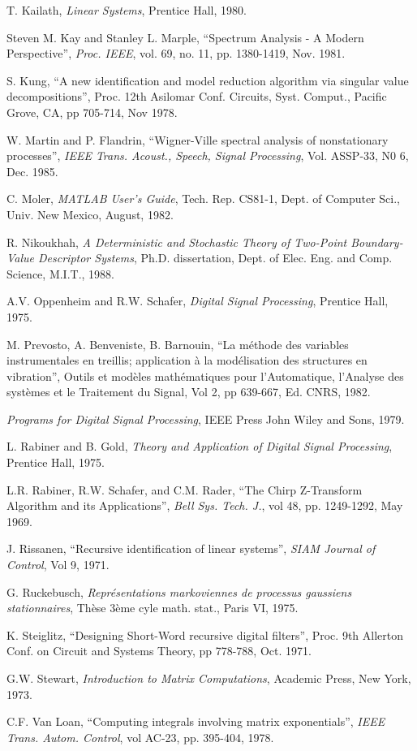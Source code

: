 \begin{thebibliography}{99}
 T. Kailath, {\em Linear Systems}, Prentice Hall, 1980.

 Steven M. Kay and Stanley L. Marple, ``Spectrum Analysis - A Modern Perspective'', {\em Proc. IEEE}, vol. 69, no. 11, pp. 1380-1419, Nov. 1981.

 S. Kung, ``A new identification and model reduction algorithm via singular value decompositions'', Proc. 12th Asilomar Conf. Circuits, Syst. Comput., Pacific Grove, CA, pp 705-714, Nov 1978.


 W. Martin and P. Flandrin, ``Wigner-Ville spectral analysis of nonstationary processes'', {\em IEEE Trans. Acoust., Speech, Signal Processing}, Vol. ASSP-33, N0 6, Dec. 1985.

  C. Moler, {\em MATLAB User's  Guide},  Tech.  Rep.  CS81-1, Dept.  of Computer Sci., Univ.  New Mexico, August, 1982.


 R. Nikoukhah, {\em A Deterministic and Stochastic Theory of Two-Point Boundary-Value Descriptor Systems}, Ph.D. dissertation, Dept. of Elec. Eng. and Comp. Science, M.I.T., 1988.

 A.V. Oppenheim and R.W. Schafer, {\em Digital Signal Processing}, Prentice Hall, 1975.

 M. Prevosto, A. Benveniste, B. Barnouin, ``La m\'ethode des variables instrumentales en treillis; application \`a la mod\'elisation des structures en vibration'', Outils et mod\`eles math\'ematiques pour l'Automatique, l'Analyse des syst\`emes et le Traitement du Signal, Vol 2, pp 639-667, Ed. CNRS, 1982.

 {\em Programs for Digital Signal Processing}, IEEE Press John Wiley and Sons, 1979.

 L. Rabiner and B. Gold, {\em Theory and Application of Digital Signal Processing}, Prentice Hall, 1975.

 L.R. Rabiner, R.W. Schafer, and C.M. Rader, ``The Chirp Z-Transform Algorithm and its Applications'', {\em Bell Sys. Tech. J.}, vol 48, pp. 1249-1292, May 1969.

 J. Rissanen, ``Recursive identification of linear systems'', {\em SIAM Journal of Control}, Vol 9, 1971.

 G. Ruckebusch, {\em Repr\'esentations markoviennes de processus gaussiens stationnaires}, Th\`ese 3\`eme cyle math. stat., Paris VI, 1975.

 K. Steiglitz, ``Designing Short-Word recursive digital filters'', Proc. 9th Allerton Conf. on Circuit and Systems Theory, pp 778-788, Oct. 1971.

 G.W. Stewart, {\em Introduction to Matrix Computations}, Academic Press, New York, 1973.

 C.F. Van Loan,  ``Computing integrals involving matrix exponentials'', {\em IEEE Trans. Autom. Control}, vol AC-23, pp. 395-404, 1978.

\end{thebibliography}

